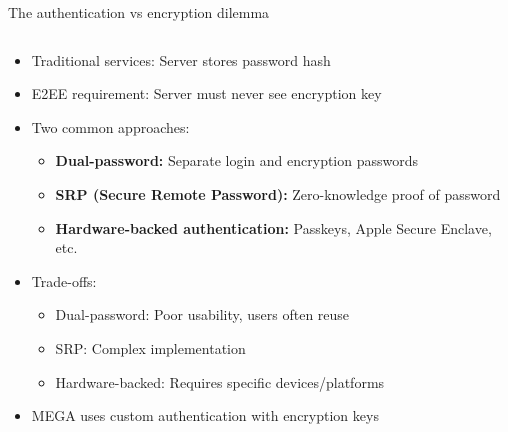 \documentclass[aspectratio=169, lualatex, handout]{beamer}
\begin{document}
\begin{frame}{The authentication vs encryption dilemma}
	\begin{columns}[c]
		\begin{column}{1\textwidth}
			\begin{itemize}
				\item Traditional services: Server stores password hash
				\item E2EE requirement: Server must never see encryption key
				\item Two common approaches:
				      \begin{itemize}
					      \item \textbf{Dual-password:} Separate login and encryption passwords
					      \item \textbf{SRP (Secure Remote Password):} Zero-knowledge proof of password
					      \item \textbf{Hardware-backed authentication:} Passkeys, Apple Secure Enclave, etc.
				      \end{itemize}
				\item Trade-offs:
				      \begin{itemize}
					      \item Dual-password: Poor usability, users often reuse
					      \item SRP: Complex implementation
					      \item Hardware-backed: Requires specific devices/platforms
				      \end{itemize}
				\item MEGA uses custom authentication with encryption keys
			\end{itemize}
		\end{column}
	\end{columns}
\end{frame}
\end{document}
